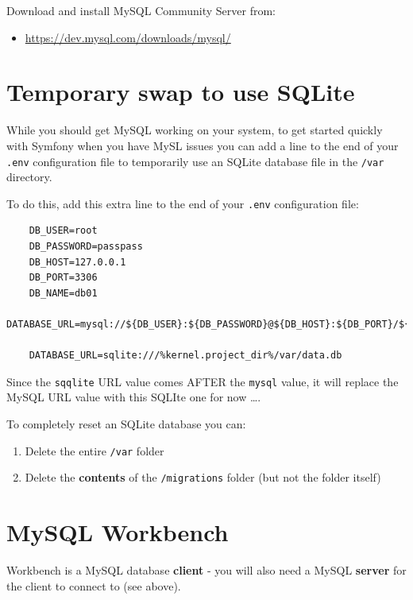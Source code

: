 \documentclass[a4paperpaper,openright]{book}
\providecommand{\tightlist}{%
  \setlength{\itemsep}{0pt}\setlength{\parskip}{0pt}}
\begin{document}
Download and install MySQL Community Server from:

\begin{itemize}
\tightlist
\item
  \url{https://dev.mysql.com/downloads/mysql/}
\end{itemize}

\hypertarget{temporary-swap-to-use-sqlite}{%
\section{Temporary swap to use
SQLite}\label{temporary-swap-to-use-sqlite}}

While you should get MySQL working on your system, to get started
quickly with Symfony when you have MySL issues you can add a line to the
end of your \texttt{.env} configuration file to temporarily use an
SQLite database file in the \texttt{/var} directory.

To do this, add this extra line to the end of your \texttt{.env}
configuration file:

\begin{verbatim}
    DB_USER=root
    DB_PASSWORD=passpass
    DB_HOST=127.0.0.1
    DB_PORT=3306
    DB_NAME=db01
    DATABASE_URL=mysql://${DB_USER}:${DB_PASSWORD}@${DB_HOST}:${DB_PORT}/${DB_NAME}
     
    DATABASE_URL=sqlite:///%kernel.project_dir%/var/data.db
\end{verbatim}

Since the \texttt{sqqlite} URL value comes AFTER the \texttt{mysql}
value, it will replace the MySQL URL value with this SQLIte one for now
\ldots{}.

To completely reset an SQLite database you can:

\begin{enumerate}
\def\labelenumi{\arabic{enumi}.}
\item
  Delete the entire \texttt{/var} folder
\item
  Delete the \textbf{contents} of the \texttt{/migrations} folder (but
  not the folder itself)
\end{enumerate}

\hypertarget{mysql-workbench}{%
\section{MySQL Workbench}\label{mysql-workbench}}

Workbench is a MySQL database \textbf{client} - you will also need a
MySQL \textbf{server} for the client to connect to (see above).
\end{document}
